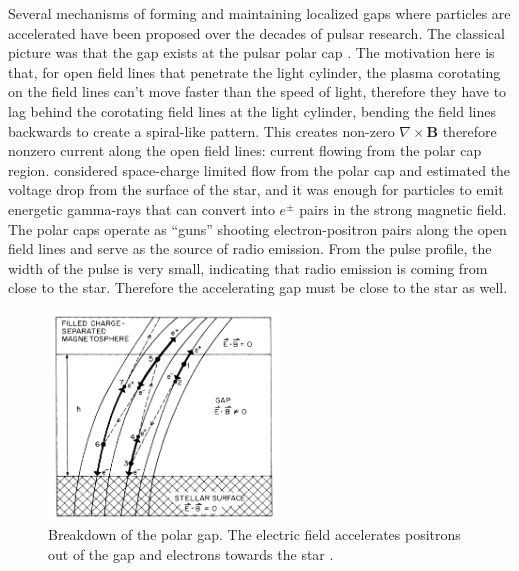 Several mechanisms of forming and maintaining localized gaps where particles are
accelerated have been proposed over the decades of pulsar research. The
classical picture was that the gap exists at the pulsar polar cap
\citep{sturrock_model_1971}. The motivation here is that, for open field lines
that penetrate the light cylinder, the plasma corotating on the field lines
can't move faster than the speed of light, therefore they have to lag behind the
corotating field lines at the light cylinder, bending the field lines backwards
to create a spiral-like pattern. This creates non-zero $\nabla\times \mathbf{B}$
therefore nonzero current along the open field lines: current flowing from the
polar cap region. \citet{sturrock_model_1971} considered space-charge limited
flow \citep{pierce_theory_1954} from the polar cap and estimated the voltage
drop from the surface of the star, and it was enough for particles to emit
energetic gamma-rays that can convert into $e^{\pm}$ pairs in the strong
magnetic field. The polar caps operate as ``guns'' shooting electron-positron
pairs along the open field lines and serve as the source of radio emission. From
the pulse profile, the width of the pulse is very small, indicating that radio
emission is coming from close to the star. Therefore the accelerating gap must
be close to the star as well.

\begin{figure}[h]
  \centering
  \includegraphics[width=0.55\textwidth]{pics/intro/ruderman-sutherland.png}
  \caption[Breakdown of the polar gap.]{Breakdown of the polar gap. The electric
    field accelerates positrons out of the gap and electrons towards the star
    \citep{ruderman_theory_1975}.}
  \label{fig:ruderman-gap-pic}
\end{figure}


